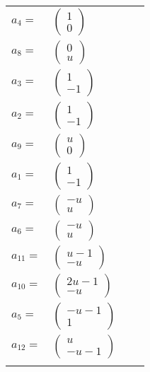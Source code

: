 \documentclass[1p]{elsarticle_modified}
\theoremstyle{definition}
\begin{document}
\begin{tabular}{m{7pt} m{180pt} m{7pt} m{180pt} }
\flushright $a_{4}=$&$\begin{pmatrix}1\\0\end{pmatrix}$ \\
\flushright $a_{8}=$&$\begin{pmatrix}0\\u\end{pmatrix}$ \\
\flushright $a_{3}=$&$\begin{pmatrix}1\\-1\end{pmatrix}$ \\
\flushright $a_{2}=$&$\begin{pmatrix}1\\-1\end{pmatrix}$ \\
\flushright $a_{9}=$&$\begin{pmatrix}u\\0\end{pmatrix}$ \\
\flushright $a_{1}=$&$\begin{pmatrix}1\\-1\end{pmatrix}$ \\
\flushright $a_{7}=$&$\begin{pmatrix}- u\\u\end{pmatrix}$ \\
\flushright $a_{6}=$&$\begin{pmatrix}- u\\u\end{pmatrix}$ \\
\flushright $a_{11}=$&$\begin{pmatrix}u-1\\- u\end{pmatrix}$ \\
\flushright $a_{10}=$&$\begin{pmatrix}2 u-1\\- u\end{pmatrix}$ \\
\flushright $a_{5}=$&$\begin{pmatrix}- u-1\\1\end{pmatrix}$ \\
\flushright $a_{12}=$&$\begin{pmatrix}u\\- u-1\end{pmatrix}$\\&\end{tabular}
\end{document}
